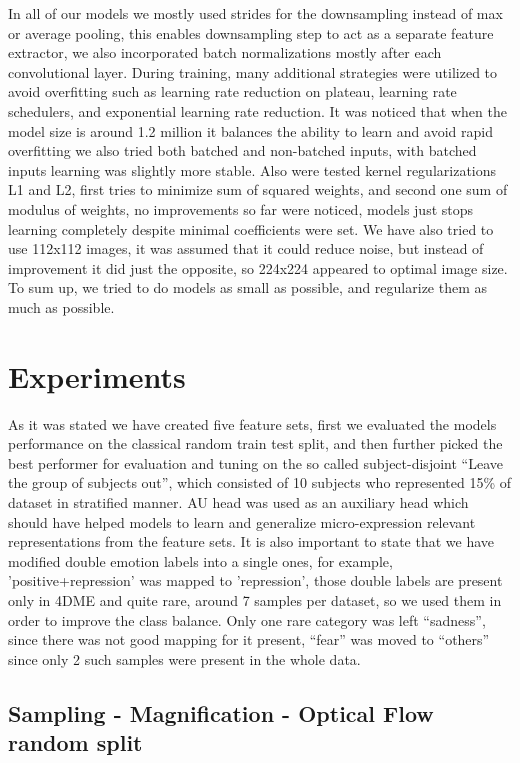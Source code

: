 \documentclass{article}
\begin{document}
In all of our models we mostly used strides for the downsampling instead of max or average pooling, this enables downsampling step to act as a separate feature extractor, we also incorporated batch normalizations mostly after each convolutional layer. During training, many additional strategies were utilized to avoid overfitting such as learning rate reduction on plateau, learning rate schedulers, and exponential learning rate reduction. It was noticed that when the model size is around 1.2 million it balances the ability to learn and avoid rapid overfitting we also tried both batched and non-batched inputs, with batched inputs learning was slightly more stable. Also were tested kernel regularizations L1 and L2, first tries to minimize sum of squared weights, and second one sum of modulus of weights, no improvements so far were noticed, models just stops learning completely despite minimal coefficients were set. We have also tried to use 112x112 images, it was assumed that it could reduce noise, but instead of improvement it did just the opposite, so 224x224 appeared to optimal image size. To sum up, we tried to do models as small as possible, and regularize them as much as possible.

\section{Experiments}

As it was stated we have created five feature sets, first we evaluated the models performance on the classical random train test split, and then further picked the best performer for evaluation and tuning on the so called subject-disjoint “Leave the group of subjects out”, which consisted of 10 subjects who represented 15\% of dataset in stratified manner. AU head was used as an auxiliary head which should have helped models to learn and generalize micro-expression relevant representations from the feature sets. It is also important to state that we have modified double emotion labels into a single ones, for example, 'positive+repression' was mapped to 'repression', those double labels are present only in 4DME and quite rare, around 7 samples per dataset, so we used them in order to improve the class balance. Only one rare category was left “sadness”, since there was not good mapping for it present, “fear” was moved to “others” since only 2 such samples were present in the whole data.

\subsection{Sampling - Magnification - Optical Flow random split}
\end{document}
